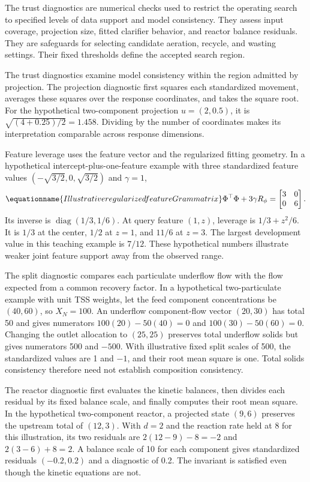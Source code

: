 The trust diagnostics are numerical checks used to restrict the operating search to specified levels of data support and model consistency. They assess input coverage, projection size, fitted clarifier behavior, and reactor balance residuals. They are safeguards for selecting candidate aeration, recycle, and wasting settings. Their fixed thresholds define the accepted search region.

The trust diagnostics examine model consistency within the region admitted by projection. The projection diagnostic first squares each standardized movement, averages these squares over the response coordinates, and takes the square root. For the hypothetical two-component projection $u=(2,0.5)$, it is $\sqrt{(4+0.25)/2}=1.458$. Dividing by the number of coordinates makes its interpretation comparable across response dimensions.

Feature leverage uses the feature vector and the regularized fitting geometry. In a hypothetical intercept-plus-one-feature example with three standardized feature values $(-\sqrt{3/2},0,\sqrt{3/2})$ and $\gamma=1$,
\begin{equation}
\equationname{Illustrative regularized feature Gram matrix}
\Phi^\top\Phi+3\gamma R_\phi=
\begin{bmatrix}3&0\\0&6\end{bmatrix}.
\end{equation}
Its inverse is $\operatorname{diag}(1/3,1/6)$. At query feature $(1,z)$, leverage is $1/3+z^2/6$. It is $1/3$ at the center, $1/2$ at $z=1$, and $11/6$ at $z=3$. The largest development value in this teaching example is $7/12$. These hypothetical numbers illustrate weaker joint feature support away from the observed range.

The split diagnostic compares each particulate underflow flow with the flow expected from a common recovery factor. In a hypothetical two-particulate example with unit TSS weights, let the feed component concentrations be $(40,60)$, so $X_N=100$. An underflow component-flow vector $(20,30)$ has total 50 and gives numerators $100(20)-50(40)=0$ and $100(30)-50(60)=0$. Changing the outlet allocation to $(25,25)$ preserves total underflow solids but gives numerators 500 and $-500$. With illustrative fixed split scales of 500, the standardized values are 1 and $-1$, and their root mean square is one. Total solids consistency therefore need not establish composition consistency.

The reactor diagnostic first evaluates the kinetic balances, then divides each residual by its fixed balance scale, and finally computes their root mean square. In the hypothetical two-component reactor, a projected state $(9,6)$ preserves the upstream total of $(12,3)$. With $d=2$ and the reaction rate held at 8 for this illustration, its two residuals are $2(12-9)-8=-2$ and $2(3-6)+8=2$. A balance scale of 10 for each component gives standardized residuals $(-0.2,0.2)$ and a diagnostic of 0.2. The invariant is satisfied even though the kinetic equations are not.


